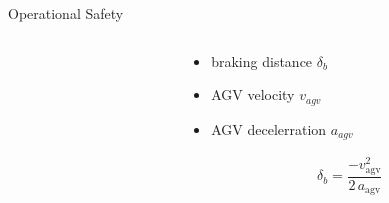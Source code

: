\documentclass[10pt,aspectratio=1610]{beamer} %
\begin{document}
\begin{frame}{Operational Safety}
	\begin{columns}[onlytextwidth]
		\begin{column}{0.7\textwidth}
			\begin{center}
			\def\svgwidth{1.2\textwidth}
			
			\end{center}
		\end{column}

		\begin{column}{0.3\textwidth}
			\begin{itemize}[label=\textbullet]
				\item braking distance ${\delta}_{b}$
				\item AGV velocity $v_{agv}$
				\item AGV decelerration $a_{agv}$
			\end{itemize}
		\begin{align*}
			\delta_{b} = \dfrac{-v^{2}_{\mathrm{agv}}}{2\,a_{\mathrm{agv}}}
		\end{align*}
		\end{column}
	\end{columns}
\end{frame}
\end{document}
